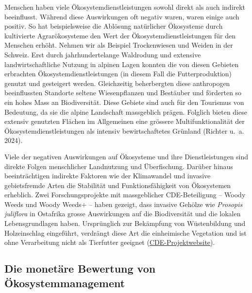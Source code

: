 \documentclass[
  nswissgerman,
  a4paper,
  openany]{book}
\begin{document}
Menschen haben viele Ökosystemdienstleistungen sowohl direkt als auch
indirekt beeinflusst. Während diese Auswirkungen oft negativ waren,
waren einige auch positiv. So hat beispielsweise die Ablösung
natürlicher Ökosysteme durch kultivierte Agrarökosysteme den Wert der
Ökosystemdienstleistungen für den Menschen erhöht. Nehmen wir als
Beispiel Trockenwiesen und Weiden in der Schweiz. Erst durch
jahrhundertelange Waldrodung und extensive landwirtschaftliche Nutzung
in alpinen Lagen konnten die von diesen Gebieten erbrachten
Ökosystemdienstleistungen (in diesem Fall die Futterproduktion) genutzt
und gesteigert werden. Gleichzeitig beherbergten diese anthropogen
beeinflussten Standorte seltene Wiesenpflanzen und Bestäuber und
förderten so ein hohes Mass an Biodiversität. Diese Gebiete sind auch
für den Tourismus von Bedeutung, da sie die alpine Landschaft
massgeblich prägen. Folglich bieten diese extensiv genutzten Flächen im
Allgemeinen eine grössere Multifunktionalität der
Ökosystemdienstleistungen als intensiv bewirtschaftetes Grünland
(Richter u.~a. 2024).

Viele der negativen Auswirkungen auf Ökosysteme und ihre
Dienstleistungen sind direkte Folgen menschlicher Landnutzung und
Überfischung. Darüber hinaus beeinträchtigen indirekte Faktoren wie der
Klimawandel und invasive gebietsfremde Arten die Stabilität und
Funktionsfähigkeit von Ökosystemen erheblich. Zwei Forschungsprojekte
mit massgeblicher CDE-Beteiligung -- Woody Weeds und Woody Weeds+ --
haben gezeigt, dass invasive Gehölze wie \emph{Prosopis juliflora} in
Ostafrika grosse Auswirkungen auf die Biodiversität und die lokalen
Lebensgrundlagen haben. Ursprünglich zur Bekämpfung von Wüstenbildung
und Holzeinschlag eingeführt, verdrängt diese Art die einheimische
Vegetation und ist ohne Verarbeitung nicht als Tierfutter geeignet
(\href{https://www.cde.unibe.ch/research/projects/woody_invasive_alien_species_in_eastern_africa/index_eng.html}{CDE-Projektwebsite}).

\subsection{Die monetäre Bewertung von
Ökosystemmanagement}\label{die-monetuxe4re-bewertung-von-uxf6kosystemmanagement}
\end{document}
